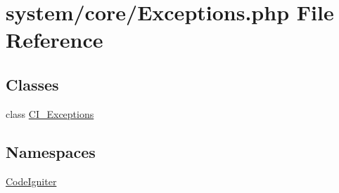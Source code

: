 \hypertarget{_exceptions_8php}{}\section{system/core/\+Exceptions.php File Reference}
\label{_exceptions_8php}
\subsection*{Classes}
\begin{DoxyCompactItemize}
\item 
class \mbox{\hyperlink{class_c_i___exceptions}{C\+I\+\_\+\+Exceptions}}
\end{DoxyCompactItemize}
\subsection*{Namespaces}
\begin{DoxyCompactItemize}
\item 
 \mbox{\hyperlink{namespace_code_igniter}{Code\+Igniter}}
\end{DoxyCompactItemize}

